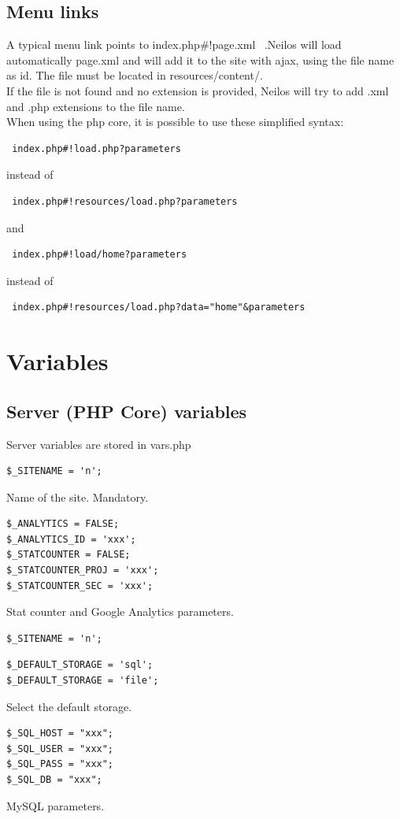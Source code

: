 \documentclass[a4paper,12pt]{article}
\begin{document}
\subsection{Menu links}
A typical menu link points to index.php\#!page.xml \ .Neilos will load automatically page.xml and will add it to the site with ajax, using the file name as id. The file must be located in resources/content/.\\
If the file is not found and no extension is provided, Neilos will try to add .xml and .php extensions to the file name.\\
When using the php core, it is possible to use these simplified syntax:
\begin{verbatim}
 index.php#!load.php?parameters
\end{verbatim}
instead of 
\begin{verbatim}
 index.php#!resources/load.php?parameters
\end{verbatim}
and
\begin{verbatim}
 index.php#!load/home?parameters
\end{verbatim}
instead of
\begin{verbatim}
 index.php#!resources/load.php?data="home"&parameters
\end{verbatim}



\section{Variables}
\subsection{Server (PHP Core) variables}
Server variables are stored in vars.php

\begin{list}{-}{}
\item \begin{verbatim}
$_SITENAME = 'n';
\end{verbatim}
Name of the site. Mandatory.
\item \begin{verbatim}
$_ANALYTICS = FALSE;
$_ANALYTICS_ID = 'xxx';
$_STATCOUNTER = FALSE;
$_STATCOUNTER_PROJ = 'xxx';
$_STATCOUNTER_SEC = 'xxx';
\end{verbatim}
Stat counter and Google Analytics parameters.
\item \begin{verbatim}
$_SITENAME = 'n';
\end{verbatim}
\item \begin{verbatim}
$_DEFAULT_STORAGE = 'sql';
$_DEFAULT_STORAGE = 'file';
\end{verbatim}
Select the default storage.
\item \begin{verbatim}
$_SQL_HOST = "xxx";
$_SQL_USER = "xxx";
$_SQL_PASS = "xxx";
$_SQL_DB = "xxx";
\end{verbatim}
MySQL parameters.
\end{list}
\end{document}
